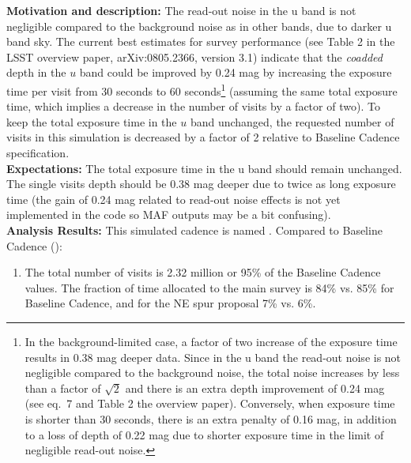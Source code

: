 

{\bf Motivation and description:} The read-out noise in the u band is
not negligible compared to the background noise as in other bands, due
to darker u band sky. The current best estimates for survey
performance (see Table 2 in the LSST overview paper, arXiv:0805.2366,
version 3.1) indicate that the {\it coadded} depth in the $u$ band
could be improved by 0.24 mag by increasing the exposure time per
visit from 30 seconds to 60 seconds\footnote{In the background-limited
case, a factor of two increase of the exposure time results in 0.38
mag deeper data. Since in the u band the read-out noise is not
negligible compared to the background noise, the total noise increases
by less than a factor of $\sqrt{2}$ and there is an extra depth
improvement of 0.24 mag (see eq.~7 and Table 2 the overview paper).
Conversely, when exposure time is shorter than 30 seconds, there is an
extra penalty of 0.16 mag, in addition to a loss of depth of 0.22 mag
due to shorter exposure time in the limit of negligible read-out
noise.} (assuming the same total exposure time, which implies a
decrease in the number of visits by a factor of two). To keep the
total exposure time in the $u$ band unchanged, the requested number of
visits in this simulation is decreased by a factor of 2 relative to
Baseline Cadence specification. \\

{\bf Expectations:} The total exposure time in the u band should
remain unchanged. The single visits depth should be 0.38 mag deeper
due to twice as long exposure time (the gain of 0.24 mag related to
read-out noise effects is not yet implemented in the \OpSim code so MAF
outputs may be a bit confusing). \\

{\bf Analysis Results:} This simulated cadence is named .  Compared
to Baseline Cadence ():
\begin{enumerate}
\item The total number of visits is 2.32 million or 95\% of the
Baseline Cadence values. The fraction of time allocated to the main
survey is 84\% vs. 85\% for Baseline Cadence, and for the NE spur
proposal 7\% vs. 6\%. %
\end{enumerate}

